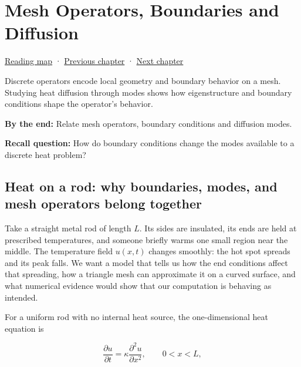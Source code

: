 \chapter{Mesh Operators, Boundaries and Diffusion}\label{04-visual-computing-ii-ch030-mesh-operators-boundaries-and-diffusion}\hypertarget{04-visual-computing-ii-ch030}{}\label{stagechapter:04-visual-computing-ii-ch030}

\hypertarget{04-visual-computing-ii-ch030-mesh-operators-boundaries-and-diffusion}{}

\hyperref[volume-reading-map]{Reading map} · \hyperref[04-visual-computing-ii-ch029-acceleration-structures-and-robust-queries]{Previous chapter} · \hyperref[04-visual-computing-ii-ch041]{Next chapter}

Discrete operators encode local geometry and boundary behavior on a mesh. Studying heat diffusion through modes shows how eigenstructure and boundary conditions shape the operator's behavior.

\textbf{By the end:} Relate mesh operators, boundary conditions and diffusion modes.

\textbf{Recall question:} How do boundary conditions change the modes available to a discrete heat problem?

\section{Heat on a rod: why boundaries, modes, and mesh operators belong together}\label{04-visual-computing-ii-ch030-heat-on-a-rod-why-boundaries-modes-and-mesh-operators-belong-together}

\hypertarget{04-visual-computing-ii-ch030-heat-on-a-rod-why-boundaries-modes-and-mesh-operators-belong-together}{}

Take a straight metal rod of length \(L\). Its sides are insulated, its ends are held at prescribed temperatures, and someone briefly warms one small region near the middle. The temperature field \(u(x,t)\) changes smoothly: the hot spot spreads and its peak falls. We want a model that tells us how the end conditions affect that spreading, how a triangle mesh can approximate it on a curved surface, and what numerical evidence would show that our computation is behaving as intended.

For a uniform rod with no internal heat source, the one-dimensional heat equation is

\[
\frac{\partial u}{\partial t}=\kappa\frac{\partial^2u}{\partial x^2},\qquad 0<x<L,
\]

